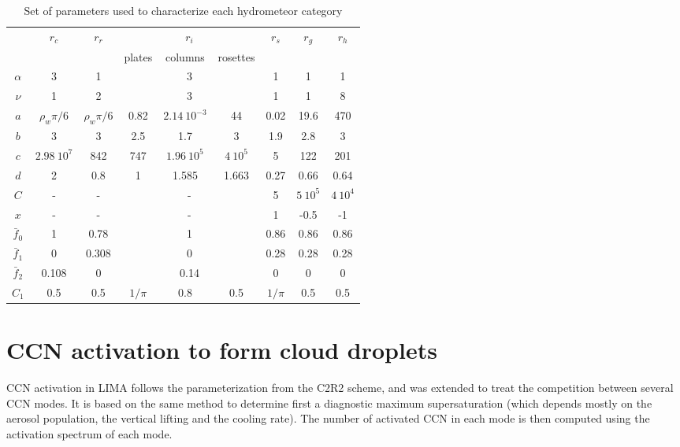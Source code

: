 \begin{table}
\caption{Set of parameters used to characterize each hydrometeor category}
\begin{center}\label{hydrometeors-parameters}
\begin{tabular}{|c||c|c|c|c|c|c|c|c|}
\hline 
            & $r_c$ & $r_r$ & \multicolumn{3}{|c|}{$r_i$} & $r_s$ & $r_g$ & $r_h$ \\
            &       &       & plates & columns & rosettes &       &       &       \\
\hline \hline
$\alpha$    & 3 & 1 & \multicolumn{3}{|c|}{3} & 1 & 1 & 1 \\
$\nu$       & 1 & 2 & \multicolumn{3}{|c|}{3} & 1 & 1 & 8 \\
\hline
$a$         & $\rho_w \pi / 6$ & $\rho_w \pi / 6$ & 0.82 & $2.14~10^{-3}$ & 44 & 0.02 & 19.6 & 470 \\
$b$         & 3 & 3 & 2.5 & 1.7 & 3 & 1.9 & 2.8 & 3 \\
\hline
$c$         & $2.98~10^7$ & 842 & 747 & $1.96~10^5$ & $4~10^5$ & 5 & 122 & 201 \\
$d$         & 2 & 0.8 & 1 & 1.585 & 1.663 & 0.27 & 0.66 & 0.64 \\
\hline
$C$         & - & - & \multicolumn{3}{|c|}{-} & 5 & $5~10^5$ & $4~10^4$ \\
$x$         & - & - & \multicolumn{3}{|c|}{-} & 1 & -0.5 & -1 \\
\hline
$\bar{f}_0$ & 1 & 0.78 & \multicolumn{3}{|c|}{1} & 0.86 & 0.86 & 0.86 \\
$\bar{f}_1$ & 0 & 0.308 & \multicolumn{3}{|c|}{0} & 0.28 & 0.28 & 0.28 \\
$\bar{f}_2$ & 0.108 & 0 & \multicolumn{3}{|c|}{0.14} & 0 & 0 & 0 \\
\hline
$C_1$       & 0.5 & 0.5 & $1/\pi$ & 0.8 & 0.5 & $1/\pi$ & 0.5 & 0.5 \\
\hline
\end{tabular}
\end{center}
\end{table}


\section{CCN activation to form cloud droplets}

CCN activation in LIMA follows the parameterization from the C2R2 scheme, and was extended to treat the competition between several CCN modes. It is based on the same method to determine first a diagnostic maximum supersaturation (which depends mostly on the aerosol population, the vertical lifting and the cooling rate). The number of activated CCN in each mode is then computed using the activation spectrum of each mode.

